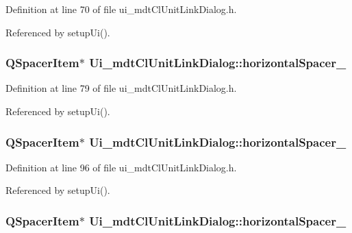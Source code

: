 Definition at line 70 of file ui\-\_\-mdt\-Cl\-Unit\-Link\-Dialog.\-h.



Referenced by setup\-Ui().

\hypertarget{class_ui__mdt_cl_unit_link_dialog_adb015c7d7ae952a36b60e9b34a1b520e}{
\subsubsection[{horizontal\-Spacer\-\_\-2}]{\setlength{\rightskip}{0pt plus 5cm}Q\-Spacer\-Item$\ast$ Ui\-\_\-mdt\-Cl\-Unit\-Link\-Dialog\-::horizontal\-Spacer\-\_}}\label{class_ui__mdt_cl_unit_link_dialog_adb015c7d7ae952a36b60e9b34a1b520e}


Definition at line 79 of file ui\-\_\-mdt\-Cl\-Unit\-Link\-Dialog.\-h.



Referenced by setup\-Ui().

\hypertarget{class_ui__mdt_cl_unit_link_dialog_a9ca028e3363657d92a0d21113f436745}{
\subsubsection[{horizontal\-Spacer\-\_\-3}]{\setlength{\rightskip}{0pt plus 5cm}Q\-Spacer\-Item$\ast$ Ui\-\_\-mdt\-Cl\-Unit\-Link\-Dialog\-::horizontal\-Spacer\-\_}}\label{class_ui__mdt_cl_unit_link_dialog_a9ca028e3363657d92a0d21113f436745}


Definition at line 96 of file ui\-\_\-mdt\-Cl\-Unit\-Link\-Dialog.\-h.



Referenced by setup\-Ui().

\hypertarget{class_ui__mdt_cl_unit_link_dialog_a5b6f6167f448ff6f5244fc361a2929ca}{
\subsubsection[{horizontal\-Spacer\-\_\-4}]{\setlength{\rightskip}{0pt plus 5cm}Q\-Spacer\-Item$\ast$ Ui\-\_\-mdt\-Cl\-Unit\-Link\-Dialog\-::horizontal\-Spacer\-\_}}\label{class_ui__mdt_cl_unit_link_dialog_a5b6f6167f448ff6f5244fc361a2929ca}


